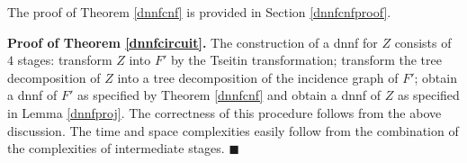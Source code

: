 \documentclass{llncs}
\begin{document}
The proof of Theorem \ref{dnnfcnf} is provided in Section \ref{dnnfcnfproof}.
\begin{comment}
We omit the proof of Theorem \ref{dnnfcnf} due to space constraints. It is similar to the proof of Theorem 16 of
\cite{DarwicheJACM}, essentially based on dynamic programming. The difference is that in addition to branching on 
assignments of variables of the given bag, the algorithm also needs to branch on the clauses of that bag that are not 
satisfied by the currently considered assignment of variables. Three choices need to be considered for each clause: to 
not satisfy the clause at all (this choice is needed for `coordination' with the `parent bag'), to satisfy the clause by
the variables of the left child and to satisfy the clause by the variables of the right child. These $3$ choices increase
the base of the exponent from $2$ to $3$. 
\end{comment}

{\bf Proof of Theorem \ref{dnnfcircuit}.}
The construction of a {\sc dnnf} for $Z$ consists of $4$ stages: transform $Z$ into $F'$ by the Tseitin transformation;
transform the tree decomposition of $Z$ into a tree decomposition of the incidence graph of $F'$; obtain a {\sc dnnf}
of $F'$ as specified by Theorem \ref{dnnfcnf} and obtain a {\sc dnnf} of $Z$ as specified in Lemma \ref{dnnfproj}.
The correctness of this procedure follows from the above discussion. The time and space complexities easily follow from 
the combination of the complexities of intermediate stages. $\blacksquare$

\begin{comment}
Apply the Tseitin transformation on $Z$ to transform it into a {\sc cnf} $F'$. 
Next, transform the tree decomposition $(T,{\bf B})$ of $Z$ into a tree decomposition
$(T^*,{\bf B^*})$ of $F'$ as specified in Lemma \ref{decomp}.
Further on, given $F'$ and $(T^*,{\bf B^*})$, obtain a {\sc dnnf} $D'$ of $F'$ as specified in
Lemma \ref{dnnfcnf}. Since the number nodes of $(T^*,{\bf B^*})$ is $O(p^2Z)$, and the width is at most $2p+1$, $D$ is constructed in time $O(3^{2p}p^2|Z|)=(9^pp^2|Z|)$. Clearly, this time absorbs the runtime of the previous two transformations and hence can be considered as the runtime of the whole transformation. 
It follows from the combination of Lemmas \ref{tseitin}, \ref{tseitindecomp}, and \ref{dnnfcnf} that 
the function computed by $Z$ is the projection of the function computed by $D' $ to the set of original
variables of $Z$.  Following Theorem 9 in the paper \cite{DNNFJACM} of Darwiche, we transform $D'$ into a {\sc dnnf}
$D$ computing the same function as $Z$ by simply replacing all wires whose inputs are literals of redundant variables
with wires having the same output but whose input is the $true$ constant. Clearly, this operation does not affect the runtime
nor the size of the resulting {\sc dnnf}. $\blacksquare$ 
\end{comment}
\end{document}
